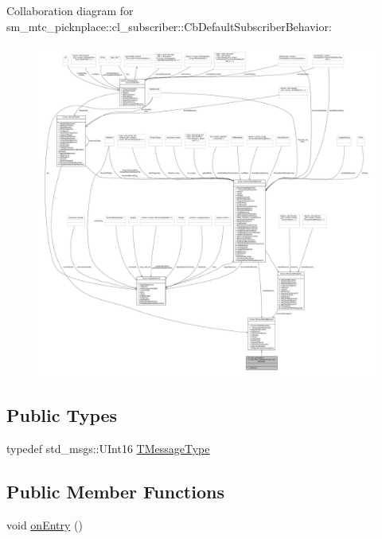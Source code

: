 Collaboration diagram for sm\+\_\+mtc\+\_\+picknplace\+:\+:cl\+\_\+subscriber\+:\+:Cb\+Default\+Subscriber\+Behavior\+:
\nopagebreak
\begin{figure}[H]
\begin{center}
\leavevmode
\includegraphics[width=350pt]{classsm__mtc__picknplace_1_1cl__subscriber_1_1CbDefaultSubscriberBehavior__coll__graph}
\end{center}
\end{figure}
\subsection*{Public Types}
\begin{DoxyCompactItemize}
\item 
typedef std\+\_\+msgs\+::\+U\+Int16 \hyperlink{classsm__mtc__picknplace_1_1cl__subscriber_1_1CbDefaultSubscriberBehavior_ad9b3bc9687ef01b576248a54c757023f}{T\+Message\+Type}
\end{DoxyCompactItemize}
\subsection*{Public Member Functions}
\begin{DoxyCompactItemize}
\item 
void \hyperlink{classsm__mtc__picknplace_1_1cl__subscriber_1_1CbDefaultSubscriberBehavior_a50cd352d8d689afcd6fe3b860e8480a6}{on\+Entry} ()
\end{DoxyCompactItemize}


